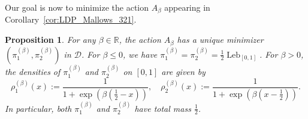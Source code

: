 \documentclass[a4paper,11pt]{amsart}
\newcommand{\R}{\mathbb R}
\DeclareMathOperator{\Leb}{Leb}
\newtheorem{prop}[thm]{Proposition}
\theoremstyle{definition}
\begin{document}
Our goal is now to minimize the action $A_{\beta}$ appearing in Corollary~\ref{cor:LDP_Mallows_321}.
\begin{prop}\label{prop:max_action}
	For any $\beta\in \R$, the action $A_{\beta}$ has a unique minimizer $(\pi_1^{(\beta)}, \pi_2^{(\beta)})$ in $\mathcal{D}$. For $\beta \leq 0$, we have $\pi_1^{(\beta)}=\pi_2^{(\beta)}=\frac{1}{2}\Leb_{[0,1]}$. 
    For $\beta>0$, the densities of $\pi_1^{(\beta)}$ and $\pi_2^{(\beta)}$ on $[0,1]$ are given by
	\begin{equation}\label{eqn:formula_maximum_action}
	    \rho_1^{(\beta)}(x) := \frac{1}{1+\exp\left(\beta(\frac12-x) \right)}, 
        \quad \rho_2^{(\beta)}(x) := \frac{1}{1+\exp\left(\beta(x-\frac12) \right)}.
	\end{equation}
	In particular, both $\pi_1^{(\beta)}$ and $\pi_2^{(\beta)}$ have total mass $\frac{1}{2}$.
\end{prop}
\end{document}
